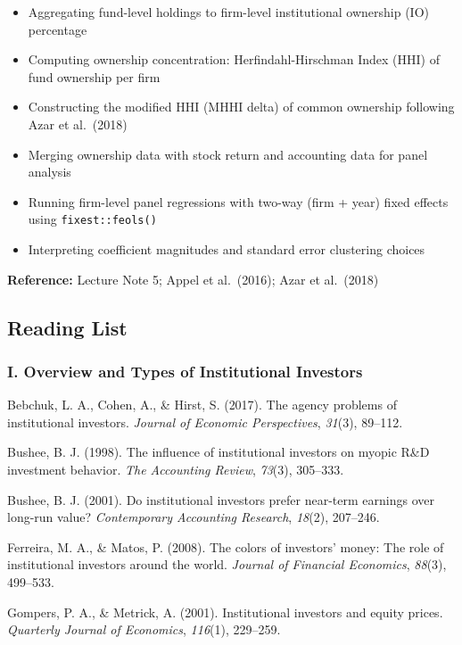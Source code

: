 \documentclass[
  12pt,
  letterpaper,
  DIV=11,
  numbers=noendperiod]{scrartcl}
\providecommand{\tightlist}{%
  \setlength{\itemsep}{0pt}\setlength{\parskip}{0pt}}
\begin{document}
\begin{itemize}
\tightlist
\item
  Aggregating fund-level holdings to firm-level institutional ownership
  (IO) percentage
\item
  Computing ownership concentration: Herfindahl-Hirschman Index (HHI) of
  fund ownership per firm
\item
  Constructing the modified HHI (MHHI delta) of common ownership
  following Azar et al.~(2018)
\item
  Merging ownership data with stock return and accounting data for panel
  analysis
\item
  Running firm-level panel regressions with two-way (firm + year) fixed
  effects using \texttt{fixest::feols()}
\item
  Interpreting coefficient magnitudes and standard error clustering
  choices
\end{itemize}

\textbf{Reference:} Lecture Note 5; Appel et al.~(2016); Azar et
al.~(2018)

\subsection{Reading List}\label{reading-list}

\subsubsection{I. Overview and Types of Institutional
Investors}\label{i.-overview-and-types-of-institutional-investors}

Bebchuk, L. A., Cohen, A., \& Hirst, S. (2017). The agency problems of
institutional investors. \emph{Journal of Economic Perspectives},
\emph{31}(3), 89--112.

Bushee, B. J. (1998). The influence of institutional investors on myopic
R\&D investment behavior. \emph{The Accounting Review}, \emph{73}(3),
305--333.

Bushee, B. J. (2001). Do institutional investors prefer near-term
earnings over long-run value? \emph{Contemporary Accounting Research},
\emph{18}(2), 207--246.

Ferreira, M. A., \& Matos, P. (2008). The colors of investors' money:
The role of institutional investors around the world. \emph{Journal of
Financial Economics}, \emph{88}(3), 499--533.

Gompers, P. A., \& Metrick, A. (2001). Institutional investors and
equity prices. \emph{Quarterly Journal of Economics}, \emph{116}(1),
229--259.
\end{document}
